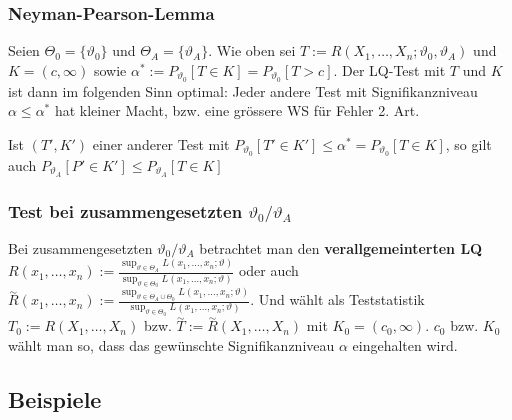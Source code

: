 \subsubsection{Neyman-Pearson-Lemma}
Seien $\Theta_0 = \{\vartheta_0\}$ und $\Theta_A = \{\vartheta_A\}$. Wie oben sei $T := R(X_1, \dots, X_n; \vartheta_0, \vartheta_A)$ und $K = (c, \infty)$ sowie $\alpha^* := P_{\vartheta_0}[T \in K] = P_{\vartheta_0}[T > c]$. Der LQ-Test mit $T$ und $K$ ist dann im folgenden Sinn optimal: Jeder andere Test mit Signifikanzniveau $\alpha \le \alpha^*$ hat kleiner Macht, bzw. eine grössere WS für Fehler 2. Art.
\begin{itemize}
     Ist $(T', K')$ einer anderer Test mit $P_{\vartheta_0}[T' \in K'] \le \alpha^* = P_{\vartheta_0}[T \in K]$, so gilt auch $P_{\vartheta_A}[P' \in K'] \le P_{\vartheta_A}[T \in K]$
\end{itemize}

\subsubsection{Test bei zusammengesetzten $\vartheta_0/\vartheta_A$}
Bei zusammengesetzten $\vartheta_0/\vartheta_A$ betrachtet man den \textbf{verallgemeinterten LQ} $R(x_1, \dots, x_n) := \frac{\sup_{\vartheta \in \Theta_A} L(x_1, \dots, x_n; \vartheta)}{\sup_{\vartheta \in \Theta_0}L(x_1, \dots, x_n; \vartheta)}$ oder auch $\overset{\sim}{R}(x_1, \dots, x_n) := \frac{\sup_{\vartheta \in \Theta_A \cup \Theta_0} L(x_1, \dots, x_n; \vartheta)}{\sup_{\vartheta \in \Theta_0}L(x_1, \dots, x_n; \vartheta)}$. Und wählt als Teststatistik $T_0 := R(X_1, \dots, X_n)$ bzw. $\overset{\sim}{T} := \overset{\sim}{R}(X_1, \dots, X_n)$ mit $K_0 = (c_0, \infty)$. $c_0$ bzw. $K_0$ wählt man so, dass das gewünschte Signifikanzniveau $\alpha$ eingehalten wird.

\subsection{Beispiele}
